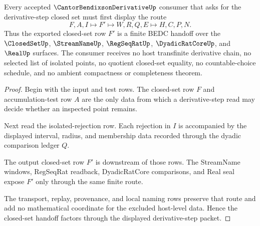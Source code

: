 \begin{theorem}
\label{thm:cantor-bendixson-derivative-closed-set-handoff}
Every accepted $\CantorBendixsonDerivativeUp$ consumer that asks for the derivative-step closed set must first display the route
$$
F,A,I \longmapsto F' \longmapsto W,R,Q,E \longmapsto H,C,P,N .
$$
Thus the exported closed-set row $F'$ is a finite BEDC handoff over the $\ClosedSetUp$, $\StreamNameUp$, $\RegSeqRatUp$, $\DyadicRatCoreUp$, and $\RealUp$ surfaces. The consumer receives no host transfinite derivative chain, no selected list of isolated points, no quotient closed-set equality, no countable-choice schedule, and no ambient compactness or completeness theorem.
\end{theorem}
\begin{proof}
Begin with the input and test rows. The closed-set row $F$ and accumulation-test row $A$ are the only data from which a derivative-step read may decide whether an inspected point remains.

Next read the isolated-rejection row. Each rejection in $I$ is accompanied by the displayed interval, radius, and membership data recorded through the dyadic comparison ledger $Q$.

The output closed-set row $F'$ is downstream of those rows. The StreamName windows, RegSeqRat readback, DyadicRatCore comparisons, and Real seal expose $F'$ only through the same finite route.

The transport, replay, provenance, and local naming rows preserve that route and add no mathematical coordinate for the excluded host-level data. Hence the closed-set handoff factors through the displayed derivative-step packet.
\end{proof}



